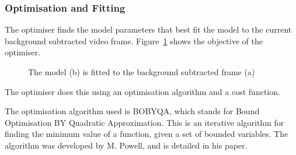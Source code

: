 \pagebreak
\subsubsection{Optimisation and Fitting}

The optimiser finds the model parameters that best fit the model to the current background subtracted video frame. Figure~\ref{fig:modelfit} shows the objective of the optimiser.

\begin{figure}[H]
    \centering
\caption{The model (b) is fitted to the background subtracted frame (a)}
\label{fig:modelfit}
\end{figure}

The optimiser does this using an optimisation algorithm and a cost function.

The optimisation algorithm used is BOBYQA, which stands for Bound Optimisation BY Quadratic Approximation. This is an iterative algorithm for finding the minimum value of a function, given a set of bounded variables. The algorithm was developed by M. Powell, and is detailed in his paper\cite{bobyqa}.

